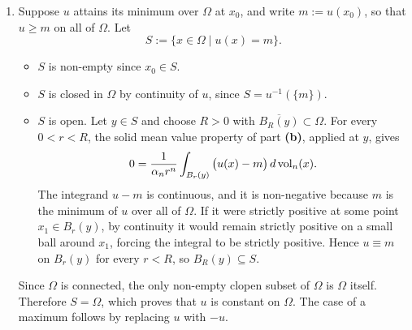 \begin{exercisesolution}
\begin{enumerate}[label=\textbf{(\alph*)}]
    To obtain the volume mean value property, integrate the spherical identity in
    polar/spherical coordinates. Spherical slicing (Fubini) writes an integral over the ball as
    an integral of its sphere integrals, and part \textbf{(b)} evaluates each of those: since
    $\phi(\rho) = u(x_0)$, the sphere $\partial B_\rho(x_0)$ contributes
    $\omega_{n-1}\rho^{n-1}u(x_0)$. Hence
    \begin{align*}
      \int_{B_r(x_0)} u(x) \, d\vol_n(x)
        &= \int_0^r \left( \int_{\partial B_\rho(x_0)} u \, d\vol_{n-1} \right) d\rho \\
        &= \int_0^r \omega_{n-1} \rho^{n-1} u(x_0) \, d\rho
         = u(x_0) \frac{\omega_{n-1} r^n}{n}.
    \end{align*}
    Note that no extra factor of $\rho^{n-1}$ enters: the surface measure $d\vol_{n-1}$ on
    $\partial B_\rho(x_0)$ already carries it, which is exactly why the sphere integral above is
    proportional to $\rho^{n-1}$ rather than constant.
    Since $\alpha_n = \omega_{n-1}/n$ is the volume of the unit ball, this yields
    \[u(x_0) = \frac{1}{\alpha_n r^n} \int_{B_r(x_0)} u(x) \, d\vol_n(x).\]

  \item Suppose $u$ attains its minimum over $\Omega$ at $x_0$, and write $m := u(x_0)$, so that
    $u \geq m$ on all of $\Omega$. Let
    \[S := \{x \in \Omega \mid u(x) = m\}.\]
    \begin{itemize}
      \item $S$ is non-empty since $x_0 \in S$.
      \item $S$ is closed in $\Omega$ by continuity of $u$, since $S = u^{-1}(\{m\})$.
      \item $S$ is open. Let $y \in S$ and choose $R > 0$ with $\overline{B_R(y)} \subset \Omega$.
        For every $0 < r < R$, the solid mean value property of part \textbf{(b)}, applied at $y$,
        gives
        \[0 = \frac{1}{\alpha_n r^n} \int_{B_r(y)} \big(u(x) - m\big) \, d\operatorname{vol}_n(x).\]
        The integrand $u - m$ is continuous, and it is non-negative because $m$ is the minimum
        of $u$ over all of $\Omega$. If it were strictly positive at some point $x_1 \in B_r(y)$,
        by continuity it would remain strictly positive on a small ball around $x_1$, forcing the
        integral to be strictly positive. Hence $u \equiv m$ on $B_r(y)$ for every $r < R$, so
        $B_R(y) \subseteq S$.
    \end{itemize}
    Since $\Omega$ is connected, the only non-empty clopen subset of $\Omega$ is $\Omega$ itself.
    Therefore $S = \Omega$, which proves that $u$ is constant on $\Omega$.
    The case of a maximum follows by replacing $u$ with $-u$.
\end{enumerate}


\end{exercisesolution}
